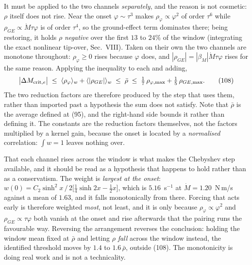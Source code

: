 \documentclass[10pt]{article}
\begin{document}
It must be applied to the two channels \emph{separately}, and the reason
is not cosmetic: $\rho$ itself does not rise. Near the onset
$\varphi\sim\tau^3$ makes $\rho_\varphi\propto\varphi^2$ of order
$\tau^6$ while $\rho_{GE}\propto\dot M\tau\varphi$ is of order $\tau^4$,
so the ground-effect term dominates there; being restoring, it holds
$\rho$ \emph{negative} over the first $13$ to $24\%$ of the window
(integrating the exact nonlinear tip-over, Sec.~VIII). Taken on their
own the two channels are monotone throughout: $\rho_\varphi\ge0$ rises
because $\varphi$ does, and $|\rho_{GE}| = |\beta_M|\dot M\tau\varphi$
rises for the same reason. Applying the inequality to each and adding,
\begin{equation}
  \bigl|\Delta M_{{\rm crit},e}\bigr|
  \;\le\; \langle\rho_\varphi\rangle_w + \langle|\rho_{GE}|\rangle_w
  \;\le\; \bar\rho
  \;\le\; \tfrac17\,\rho_{\varphi,\max} + \tfrac15\,\rho_{GE,\max} .
  \tag{108}
\end{equation}
The two reduction factors are therefore produced by the step that uses
them, rather than imported past a hypothesis the sum does not satisfy.
Note that $\bar\rho$ is the average defined at (95), and the right-hand
side bounds it rather than defining it. The constants are the reduction
factors themselves, not the factors multiplied by a kernel gain, because
the onset is located by a \emph{normalised} correlation: $\int w = 1$
leaves nothing over.

That each channel rises across the window is what makes the
Chebyshev step available, and it should be read as a hypothesis that
happens to hold rather than as a conservatism. The weight is
\emph{largest at the onset}: $w(0) = C_2\sinh^2\!x\,/\,2\bigl[\tfrac14
\sinh 2x - \tfrac12 x\bigr]$, which is $5.16$~s$^{-1}$ at
$\dot M = 1.20$~N\,m/s against a mean of $1.63$, and it falls
monotonically from there. Forcing that acts early is therefore weighted
\emph{most}, not least, and it is only because
$\rho_\varphi\propto\varphi^{2}$ and $\rho_{GE}\propto\tau\varphi$ both
vanish at the onset and rise afterwards that the pairing runs the
favourable way. Reversing the arrangement reverses the conclusion:
holding the window mean fixed at $\bar\rho$ and letting $\rho$
\emph{fall} across the window instead, the identified threshold moves
by $1.4$ to $1.6\,\bar\rho$, outside (108). The monotonicity is doing
real work and is not a technicality.
\end{document}
